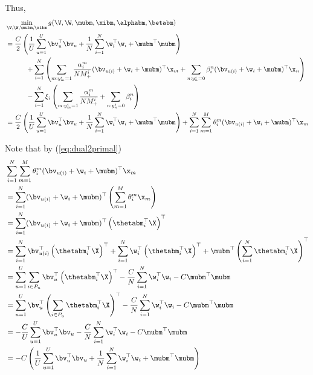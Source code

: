 Thus,
\begin{equation*}
\begin{aligned}
&\min_{\V, \W, \mubm, \xibm} g(\V, \W, \mubm, \xibm, \alphabm, \betabm) \\
&= \frac{C}{2} \left( \frac{1}{U} \sum_{u=1}^U \bv_u^\top \bv_u 
     + \frac{1}{N} \sum_{i=1}^N \w_i^\top \w_i + \mubm^\top \mubm \right) \\
& \hspace{3em}
     + \sum_{i=1}^N \left( 
       \sum_{m: y_m^i = 1} \frac{\alpha_i^m}{N M_+^i} (\bv_{u(i)} + \w_i + \mubm)^\top \x_m 
     + \sum_{n: y_n^i = 0} \beta_i^n (\bv_{u(i)} + \w_i + \mubm)^\top \x_n \right) \\
& \hspace{3em}
     - \sum_{i=1}^N \xi_i \left( \sum_{m: y_m^i = 1} \frac{\alpha_i^m}{N M_+^i} + \sum_{n: y_n^i = 0} \beta_i^n \right) \\
&= \frac{C}{2} \left( \frac{1}{U} \sum_{u=1}^U \bv_u^\top \bv_u 
     + \frac{1}{N} \sum_{i=1}^N \w_i^\top \w_i + \mubm^\top \mubm \right)
     + \sum_{i=1}^N \sum_{m=1}^M \theta_i^m (\bv_{u(i)} + \w_i + \mubm)^\top \x_m
\end{aligned}
\end{equation*}

Note that by (\ref{eq:dual2primal})
\begin{equation*}
\begin{aligned}
&\sum_{i=1}^N \sum_{m=1}^M \theta_i^m (\bv_{u(i)} + \w_i + \mubm)^\top \x_m \\
&= \sum_{i=1}^N (\bv_{u(i)} + \w_i + \mubm)^\top \left( \sum_{m=1}^M \theta_i^m \x_m \right) \\
&= \sum_{i=1}^N (\bv_{u(i)} + \w_i + \mubm)^\top \left( \thetabm_i^\top \X \right)^\top \\
&= \sum_{i=1}^N \bv_{u(i)}^\top \left( \thetabm_i^\top \X \right)^\top 
     + \sum_{i=1}^N \w_i^\top \left( \thetabm_i^\top \X \right)^\top 
     + \mubm^\top \left( \sum_{i=1}^N \thetabm_i^\top \X \right)^\top \\
&= \sum_{u=1}^U \sum_{i \in P_u} \bv_u^\top \left( \thetabm_i^\top \X \right)^\top
     - \frac{C}{N} \sum_{i=1}^N \w_i^\top \w_i 
     - C \mubm^\top \mubm \\
&= \sum_{u=1}^U \bv_u^\top \left( \sum_{i \in P_u} \thetabm_i^\top \X \right)^\top
     - \frac{C}{N} \sum_{i=1}^N \w_i^\top \w_i 
     - C \mubm^\top \mubm \\
&= -\frac{C}{U} \sum_{u=1}^U \bv_u^\top \bv_u
     - \frac{C}{N} \sum_{i=1}^N \w_i^\top \w_i 
     - C \mubm^\top \mubm \\
&= -C \left( \frac{1}{U} \sum_{u=1}^U \bv_u^\top \bv_u
     + \frac{1}{N} \sum_{i=1}^N \w_i^\top \w_i 
     + \mubm^\top \mubm \right)
\end{aligned}
\end{equation*}


